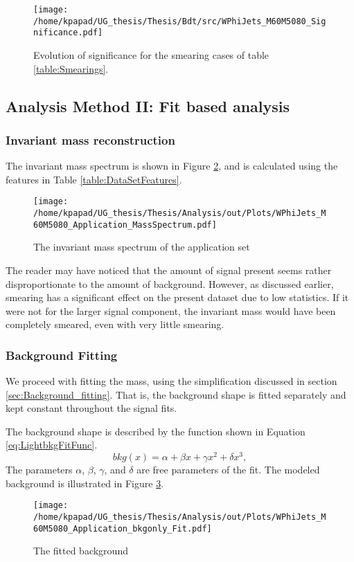 \begin{figure}[h!]
\centering
\texttt{[image: /home/kpapad/UG\_thesis/Thesis/Bdt/src/WPhiJets\_M60M5080\_Significance.pdf]}
\caption{Evolution of significance for the smearing cases of table \ref{table:Smearings}. }
\label{fig:LightSigEvolBDT}
\end{figure}

\newpage
\subsection{Analysis Method II: Fit based analysis}
\label{sec:orgfec5bb4}
\label{sec:LightAnalysis_method2}
\subsubsection{Invariant mass reconstruction}
\label{sec:orgc57c22e}
\label{sec:Light_invariant_mass_reconstruction}
 The invariant mass spectrum is shown in Figure \ref{fig:LightAppMass}, and  is calculated using the features in Table \ref{table:DataSetFeatures}. 
\begin{figure}[h]
\centering
\texttt{[image: /home/kpapad/UG\_thesis/Thesis/Analysis/out/Plots/WPhiJets\_M60M5080\_Application\_MassSpectrum.pdf]}
\caption{The invariant mass spectrum of the application set}
\label{fig:LightAppMass}
\end{figure}

The reader may have noticed that the amount of signal present seems rather disproportionate to the amount of background. However, as discussed earlier, smearing has a significant effect on the present dataset due to low statistics. If it were not for the larger signal component, the invariant mass would have been completely smeared, even with very little smearing.
\subsubsection{Background Fitting}
\label{sec:orgb79b92a}
\label{sec:Light_background_fitting}
We proceed with fitting the mass, using the simplification discussed in section \ref{sec:Background_fitting}. That is, the background shape is fitted separately and kept constant throughout the signal fits.

The background shape is described by the function shown in Equation \ref{eq:LightbkgFitFunc}.
\begin{equation}
bkg(x) =  \alpha + \beta x + \gamma x^2 + \delta x^3,
\label{eq:LightbkgFitFunc}
\end{equation}
The parameters \(\alpha\), \(\beta\), \(\gamma\), and \(\delta\) are free parameters of the fit. The modeled background is illustrated in Figure \ref{fig:LightBKGfit}.
\begin{figure}[h]
\centering
\texttt{[image: /home/kpapad/UG\_thesis/Thesis/Analysis/out/Plots/WPhiJets\_M60M5080\_Application\_bkgonly\_Fit.pdf]}
\caption{The fitted background}
\label{fig:LightBKGfit}
\end{figure}
